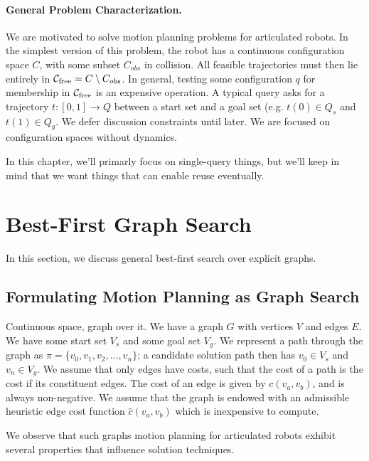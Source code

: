 \paragraph{General Problem Characterization.}

We are motivated to solve motion planning problems for articulated robots.
In the simplest version of this problem,
the robot has a continuous configuration space $C$,
with some subset $C_{obs}$ in collision.
All feasible trajectories must then lie entirely in
$\mathcal{C}_{\mbox{\scriptsize free}} = C \setminus C_{obs}$.
In general, testing some configuration $q$ for membership in
$\mathcal{C}_{\mbox{\scriptsize free}}$
is an expensive operation.
A typical query asks for a trajectory $t: [0,1] \rightarrow Q$ between
a start set and a goal set (e.g. $t(0) \in Q_s$ and $t(1) \in Q_g$.
We defer discussion constraints until later.
We are focused on configuration spaces without dynamics.

In this chapter,
we'll primarly focus on single-query things,
but we'll keep in mind that we want things that can enable reuse eventually.

\section{Best-First Graph Search}
\label{sec:best-first}

In this section,
we discuss general best-first search over explicit graphs.

\subsection{Formulating Motion Planning as Graph Search}

Continuous space, graph over it.
We have a graph $G$ with vertices $V$ and edges $E$.
We have some start set $V_s$ and some goal set $V_g$.
We represent a path through the graph as
$\pi = \{ v_0, v_1, v_2, \dots, v_n \}$;
a candidate solution path then has $v_0 \in V_s$ and $v_n \in V_g$.
We assume that only edges have costs,
such that the cost of a path is the cost if its constituent edges.
The cost of an edge is given by $c(v_a,v_b)$, and is always non-negative.
We assume that the graph is endowed with an admissible heuristic edge cost
function
$\hat{c}(v_a,v_b)$
which is inexpensive to compute.

We observe that such graphs motion planning for articulated robots
exhibit several properties that influence solution techniques.

